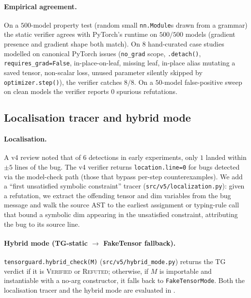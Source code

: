 \paragraph{Empirical agreement.}
On a $500$-model property test (random small \texttt{nn.Module}s
drawn from a grammar) the static verifier agrees with PyTorch's
runtime on $500/500$ models (gradient presence and gradient
shape both match). On $8$ hand-curated case studies modelled on
canonical PyTorch issues (\texttt{no\_grad} scope,
\texttt{.detach()}, \texttt{requires\_grad=False},
in-place-on-leaf, missing leaf, in-place alias mutating a saved
tensor, non-scalar loss, unused parameter silently skipped by
\texttt{optimizer.step()}), the verifier catches $8/8$. On a
$50$-model false-positive sweep on clean models the verifier
reports $0$ spurious refutations.

\subsection{Localisation tracer and hybrid mode}
\label{sec:impl-loc-hybrid}

\paragraph{Localisation.} A v4 review noted that of $6$
detections in early experiments, only $1$ landed within $\pm 5$
lines of the bug. The v4 verifier returns
\texttt{location.line=0} for bugs detected via the model-check
path (those that bypass per-step counterexamples). We add a
``first unsatisfied symbolic constraint'' tracer
(\texttt{src/v5/localization.py}): given a refutation, we
extract the offending tensor and dim variables from the bug
message and walk the source AST to the earliest assignment or
typing-rule call that bound a symbolic dim appearing in the
unsatisfied constraint, attributing the bug to its source line.

\paragraph{Hybrid mode (TG-static $\to$ FakeTensor fallback).}
\texttt{tensorguard.hybrid\_check(M)}
(\texttt{src/v5/hybrid\_mode.py}) returns the TG verdict if it
is \textsc{Verified} or \textsc{Refuted}; otherwise, if $M$ is
importable and instantiable with a no-arg constructor, it falls
back to \texttt{FakeTensorMode}. Both the localisation tracer
and the hybrid mode are evaluated in
.
